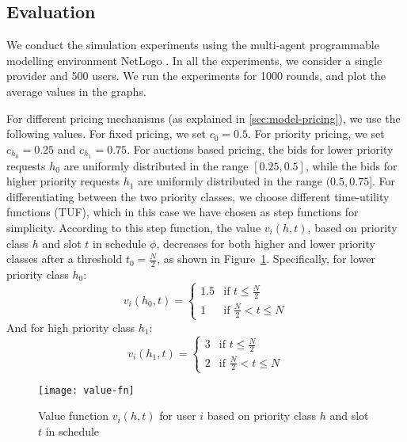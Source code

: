 
\subsection{Evaluation}
\label{sec__bandwidth_truthfulness_evaluation}

We conduct the simulation experiments using the multi-agent programmable modelling environment NetLogo \cite{Wilensky1999NetLogo}.
In all the experiments, we consider a single provider and 500 users.
We run the experiments for 1000 rounds, and plot the average values in the graphs.

For different pricing mechanisms (as explained in \cref{sec:model-pricing}), we use the following values.
	For fixed pricing, we set $c_0 = 0.5$.
	For priority pricing, we set $c_{h_0} = 0.25$ and $c_{h_1} = 0.75$.
	For auctions based pricing, the bids for lower priority requests $h_0$ are uniformly distributed in the range $[0.25, 0.5]$, 
	while the bids for higher priority requests $h_1$ are uniformly distributed in the range $(0.5, 0.75]$.
For differentiating between the two priority classes, we choose different time-utility functions (TUF), 
which in this case we have chosen as step functions for simplicity.
According to this step function, the value $v_i(h, t)$, based on priority class $h$ and slot $t$ in schedule $\phi$, 
decreases for both higher and lower priority classes after a threshold $t_0 = \frac{N}{2}$, as shown in Figure~\ref{fig:value_fn}. 
Specifically, for lower priority class $h_0$:
%
\begin{equation}
	v_i(h_0, t) = 
		\begin{cases}
		1.5 &	\text{if }	t \leq \frac{N}{2}  \\
		1 &	\text{if }	\frac{N}{2} < t \leq N
		\end{cases}
\end{equation}
%
And for high priority class $h_1$:
\begin{equation}
	v_i(h_1, t) = 
		\begin{cases}
		3 &	\text{if }	t \leq \frac{N}{2}  \\
		2 &	\text{if }	\frac{N}{2} < t \leq N
		\end{cases}
\end{equation}


\begin{figure}[tbp]
	\centering
	\texttt{[image: value-fn]}
	\caption[Value function $v_i(h, t)$ for user $i$]{Value function $v_i(h, t)$ for user $i$ based on priority class $h$ and slot $t$ in schedule}
	\label{fig:value_fn}
\end{figure} 


